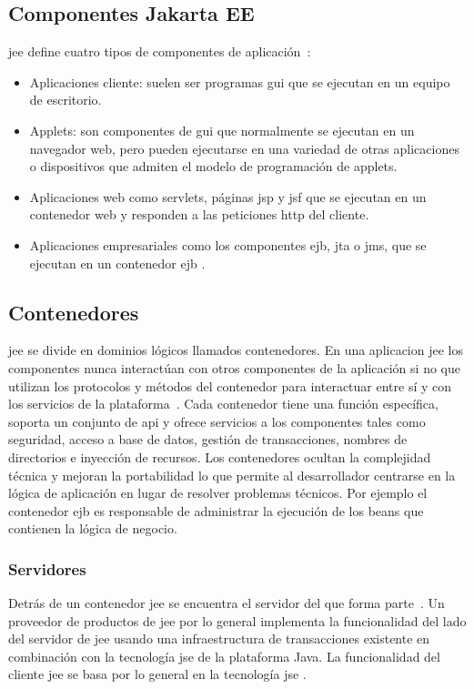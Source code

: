 \subsection{Componentes Jakarta EE}
\label{sec:componentes}
\acrshort{jee} define cuatro tipos de componentes de aplicación~\cite{JakartaEE}:
\begin{itemize}
   \item Aplicaciones cliente: suelen ser programas \acrfull{gui} que se ejecutan en un equipo de escritorio.
   \item Applets: son componentes de \acrshort{gui} que normalmente se ejecutan en un navegador web, pero pueden ejecutarse en una variedad de otras aplicaciones o dispositivos que admiten el modelo de programación de applets. 
   \item Aplicaciones web como servlets, páginas \acrfull{jsp} y \acrshort{jsf} que se ejecutan en un contenedor web y responden a las peticiones \acrshort{http} del cliente.
   \item Aplicaciones empresariales como los componentes \acrshort{ejb}, \acrshort{jta} o \acrshort{jms}, que se ejecutan en un contenedor \acrshort{ejb} .
\end{itemize}



\subsection{Contenedores}
\label{sec:contenedores}
\acrshort{jee} se divide en dominios lógicos llamados contenedores. En una aplicacion \acrshort{jee} los componentes nunca interactúan con otros componentes de la aplicación si no que utilizan los protocolos y métodos del contenedor para interactuar entre sí y con los servicios de la plataforma~\cite{JakartaEE}. Cada contenedor tiene una función específica, soporta un conjunto de \acrshort{api} y ofrece servicios a los componentes tales como seguridad, acceso a base de datos, gestión de transacciones, nombres de directorios e inyección de recursos. Los contenedores ocultan la complejidad técnica y mejoran la portabilidad lo que permite al desarrollador centrarse en la lógica de aplicación en lugar de resolver problemas técnicos. Por ejemplo el contenedor \acrshort{ejb} es responsable de administrar la ejecución de los beans que contienen la lógica de negocio.

\subsubsection{Servidores}
\label{sec:servidores}
Detrás de un contenedor \acrshort{jee} se encuentra el servidor del que forma parte~\cite{JakartaEE}. Un proveedor de productos de \acrshort{jee}  por lo general implementa la funcionalidad del lado del servidor de \acrshort{jee}  usando una infraestructura de transacciones existente en combinación con la tecnología \acrshort{jse} de la plataforma Java. La funcionalidad del cliente \acrshort{jee} se basa por lo general en la tecnología \acrshort{jse} .




